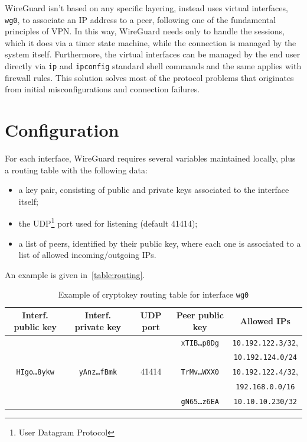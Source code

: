 \documentclass[light]{academica}
\begin{document}
WireGuard isn't based on any specific layering, instead uses virtual interfaces, \eg \texttt{wg0}, to associate an IP address to a peer, following one of the fundamental principles of VPN.
In this way, WireGuard needs only to handle the sessions, which it does via a timer state machine, while the connection is managed by the system itself.
Furthermore, the virtual interfaces can be managed by the end user directly via \texttt{ip} and \texttt{ipconfig} standard shell commands and the same applies with firewall rules.
This solution solves most of the protocol problems that originates from initial misconfigurations and connection failures.

\newpage
\section{Configuration}\label{sec:configuration}

For each interface, WireGuard requires several variables maintained locally, plus a routing table with the following data:
\begin{itemize}
  \item a key pair, consisting of public and private keys associated to the interface itself;
  \item the UDP\footnote{User Datagram Protocol} port used for listening (default 41414);
  \item a list of peers, identified by their public key, where each one is associated to a list of allowed incoming/outgoing IPs.
\end{itemize}
An example is given in~\autoref{table:routing}.

\begin{table}[H]
  \centering
  \caption{Example of cryptokey routing table for interface \texttt{wg0}}
  \label{table:routing}
  \begin{tabular}{|cc|c|cc|}
    \hline
    \textbf{Interf. public key} & \textbf{Interf. private key} & \textbf{UDP port} & \textbf{Peer public key} & \textbf{Allowed IPs} \\
    \hline
    & & & \texttt{xTIB\dots p8Dg} & \texttt{10.192.122.3/32}, \\
    & & & & \texttt{10.192.124.0/24} \\
    \texttt{HIgo\dots 8ykw} & \texttt{yAnz\dots fBmk} & 41414 & \texttt{TrMv\dots WXX0} & \texttt{10.192.122.4/32}, \\
    & & & & \texttt{192.168.0.0/16} \\
    & & & \texttt{gN65\dots z6EA} & \texttt{10.10.10.230/32} \\
    \hline
  \end{tabular}
\end{table}
\end{document}
